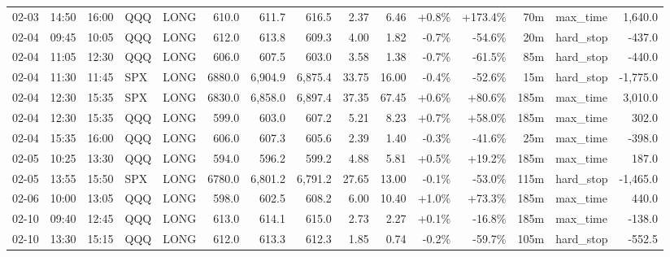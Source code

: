 \documentclass[11pt,a4paper,twoside]{article}
\begin{document}
\begin{landscape}
\begin{center}
\begin{longtable}{>{\color{txtmain}}l l l l l r r r r r r r r >{\color{txtmain}}l r}
02-03 & 14:50 & 16:00 & QQQ & LONG & 610.0 & 611.7 & 616.5 & 2.37 & 6.46 & \textcolor{wingreen}{+0.8\%} & \textcolor{wingreen}{+173.4\%} & 70m & max\_time & \textcolor{wingreen}{1,640.0} \\
02-04 & 09:45 & 10:05 & QQQ & LONG & 612.0 & 613.8 & 609.3 & 4.00 & 1.82 & \textcolor{lossred}{-0.7\%} & \textcolor{lossred}{-54.6\%} & 20m & hard\_stop & \textcolor{lossred}{-437.0} \\
02-04 & 11:05 & 12:30 & QQQ & LONG & 606.0 & 607.5 & 603.0 & 3.58 & 1.38 & \textcolor{lossred}{-0.7\%} & \textcolor{lossred}{-61.5\%} & 85m & hard\_stop & \textcolor{lossred}{-440.0} \\
02-04 & 11:30 & 11:45 & SPX & LONG & 6880.0 & 6,904.9 & 6,875.4 & 33.75 & 16.00 & \textcolor{lossred}{-0.4\%} & \textcolor{lossred}{-52.6\%} & 15m & hard\_stop & \textcolor{lossred}{-1,775.0} \\
02-04 & 12:30 & 15:35 & SPX & LONG & 6830.0 & 6,858.0 & 6,897.4 & 37.35 & 67.45 & \textcolor{wingreen}{+0.6\%} & \textcolor{wingreen}{+80.6\%} & 185m & max\_time & \textcolor{wingreen}{3,010.0} \\
02-04 & 12:30 & 15:35 & QQQ & LONG & 599.0 & 603.0 & 607.2 & 5.21 & 8.23 & \textcolor{wingreen}{+0.7\%} & \textcolor{wingreen}{+58.0\%} & 185m & max\_time & \textcolor{wingreen}{302.0} \\
02-04 & 15:35 & 16:00 & QQQ & LONG & 606.0 & 607.3 & 605.6 & 2.39 & 1.40 & \textcolor{lossred}{-0.3\%} & \textcolor{lossred}{-41.6\%} & 25m & max\_time & \textcolor{lossred}{-398.0} \\
02-05 & 10:25 & 13:30 & QQQ & LONG & 594.0 & 596.2 & 599.2 & 4.88 & 5.81 & \textcolor{wingreen}{+0.5\%} & \textcolor{wingreen}{+19.2\%} & 185m & max\_time & \textcolor{wingreen}{187.0} \\
02-05 & 13:55 & 15:50 & SPX & LONG & 6780.0 & 6,801.2 & 6,791.2 & 27.65 & 13.00 & \textcolor{lossred}{-0.1\%} & \textcolor{lossred}{-53.0\%} & 115m & hard\_stop & \textcolor{lossred}{-1,465.0} \\
02-06 & 10:00 & 13:05 & QQQ & LONG & 598.0 & 602.5 & 608.2 & 6.00 & 10.40 & \textcolor{wingreen}{+1.0\%} & \textcolor{wingreen}{+73.3\%} & 185m & max\_time & \textcolor{wingreen}{440.0} \\
02-10 & 09:40 & 12:45 & QQQ & LONG & 613.0 & 614.1 & 615.0 & 2.73 & 2.27 & \textcolor{wingreen}{+0.1\%} & \textcolor{lossred}{-16.8\%} & 185m & max\_time & \textcolor{lossred}{-138.0} \\
02-10 & 13:30 & 15:15 & QQQ & LONG & 612.0 & 613.3 & 612.3 & 1.85 & 0.74 & \textcolor{lossred}{-0.2\%} & \textcolor{lossred}{-59.7\%} & 105m & hard\_stop & \textcolor{lossred}{-552.5} \\

\end{longtable}
\end{center}
\end{landscape}
\end{document}
